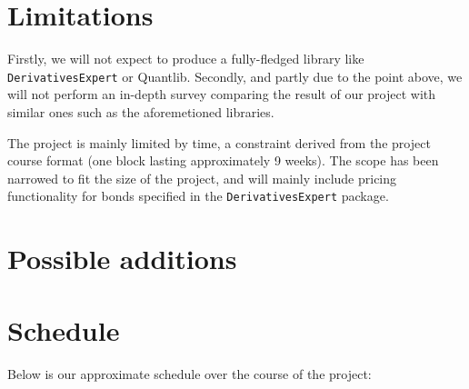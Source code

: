 \documentclass[11pt]{article}
\begin{document}
\section*{Limitations}

Firstly, we will not expect to produce a fully-fledged library like {\tt DerivativesExpert} or Quantlib\cite{Ame2003}.
Secondly, and partly due to the point above, we will not perform an in-depth survey
comparing the result of our project with similar ones such as the aforemetioned libraries.


The project is mainly limited by time, a constraint derived from the project course 
format (one block lasting approximately 9 weeks).
The scope has been narrowed to fit the size of the project, and will mainly include
pricing functionality for bonds specified in the {\tt DerivativesExpert} package.

\section*{Possible additions}

\section*{Schedule}


Below is our approximate schedule over the course of the project:\\

\begin{figure}[h!]
\begin{center}
\end{center}
\end{figure}



\end{document}
